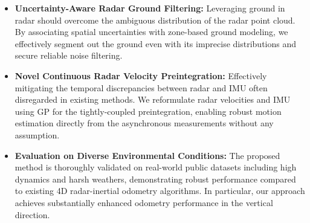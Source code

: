 \begin{itemize}
    \item \textbf{Uncertainty-Aware Radar Ground Filtering: }
    Leveraging ground in radar should overcome the ambiguous distribution of the radar point cloud. By associating spatial uncertainties with zone-based ground modeling, we effectively segment out the ground even with its imprecise distributions and secure reliable noise filtering.

    
    \item \textbf{Novel Continuous Radar Velocity Preintegration: }
    Effectively mitigating the temporal discrepancies between radar and \ac{IMU} often disregarded in existing methods. We reformulate radar velocities and \ac{IMU} using \ac{GP} for the tightly-coupled preintegration, enabling robust motion estimation directly from the asynchronous measurements without any assumption.
    
    \item \textbf{Evaluation on Diverse Environmental Conditions: }
    The proposed method is thoroughly validated on real-world public datasets including high dynamics and harsh weathers, demonstrating robust performance compared to existing 4D radar-inertial odometry algorithms. In particular, our approach achieves substantially enhanced odometry performance in the vertical direction.

\end{itemize}